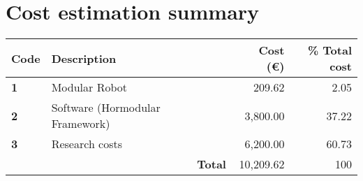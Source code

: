 \newpage
\section{Cost estimation summary}

\begin{center}
    \begin{tabular}{ | l || p{9cm}  l | r | r |}
    \hline
    \textbf{Code} & \multicolumn{1}{l}{\textbf{Description}} &  & \textbf{Cost (\euro)}  & \textbf{\% Total cost} \\ \hline \hline
    
    \textbf{1} & Modular Robot &  & 209.62 & 2.05\\ \hline
    
	\textbf{2} & Software (Hormodular Framework) &  & 3,800.00 & 37.22 \\ \hline

	\textbf{3}& Research costs &  & 6,200.00 & 60.73\\ \hline 
	
	\multicolumn{1}{r}{} & & \textbf{Total} & 10,209.62 & 100\\  \cline{4-5}
    	
	
\end{tabular}
\end{center}